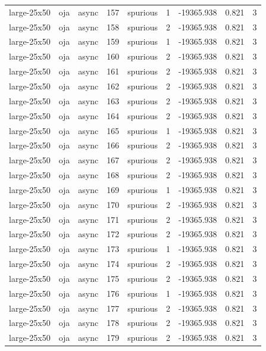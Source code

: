 \begin{tabular}{lllrlrrrr}
large-25x50 & oja & async & 157 & spurious & 1 & -19365.938 & 0.821 & 3 \\
large-25x50 & oja & async & 158 & spurious & 2 & -19365.938 & 0.821 & 3 \\
large-25x50 & oja & async & 159 & spurious & 1 & -19365.938 & 0.821 & 3 \\
large-25x50 & oja & async & 160 & spurious & 2 & -19365.938 & 0.821 & 3 \\
large-25x50 & oja & async & 161 & spurious & 2 & -19365.938 & 0.821 & 3 \\
large-25x50 & oja & async & 162 & spurious & 2 & -19365.938 & 0.821 & 3 \\
large-25x50 & oja & async & 163 & spurious & 2 & -19365.938 & 0.821 & 3 \\
large-25x50 & oja & async & 164 & spurious & 2 & -19365.938 & 0.821 & 3 \\
large-25x50 & oja & async & 165 & spurious & 1 & -19365.938 & 0.821 & 3 \\
large-25x50 & oja & async & 166 & spurious & 2 & -19365.938 & 0.821 & 3 \\
large-25x50 & oja & async & 167 & spurious & 2 & -19365.938 & 0.821 & 3 \\
large-25x50 & oja & async & 168 & spurious & 2 & -19365.938 & 0.821 & 3 \\
large-25x50 & oja & async & 169 & spurious & 1 & -19365.938 & 0.821 & 3 \\
large-25x50 & oja & async & 170 & spurious & 2 & -19365.938 & 0.821 & 3 \\
large-25x50 & oja & async & 171 & spurious & 2 & -19365.938 & 0.821 & 3 \\
large-25x50 & oja & async & 172 & spurious & 2 & -19365.938 & 0.821 & 3 \\
large-25x50 & oja & async & 173 & spurious & 1 & -19365.938 & 0.821 & 3 \\
large-25x50 & oja & async & 174 & spurious & 2 & -19365.938 & 0.821 & 3 \\
large-25x50 & oja & async & 175 & spurious & 2 & -19365.938 & 0.821 & 3 \\
large-25x50 & oja & async & 176 & spurious & 1 & -19365.938 & 0.821 & 3 \\
large-25x50 & oja & async & 177 & spurious & 2 & -19365.938 & 0.821 & 3 \\
large-25x50 & oja & async & 178 & spurious & 2 & -19365.938 & 0.821 & 3 \\
large-25x50 & oja & async & 179 & spurious & 2 & -19365.938 & 0.821 & 3 \\

\end{tabular}
